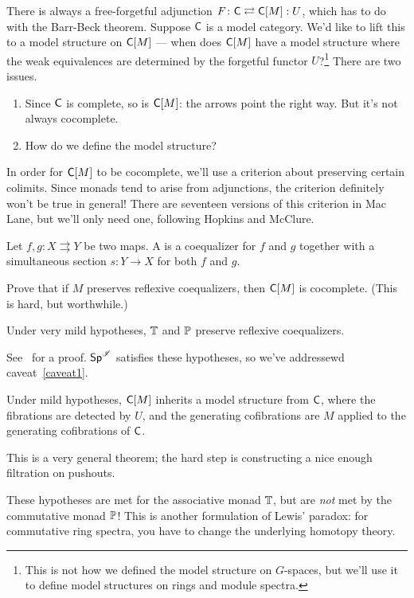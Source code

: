 There is always a free-forgetful adjunction $F\colon \fC\rightleftarrows \fC[M]: U$, which has to do with the
Barr-Beck theorem. Suppose $\fC$ is a model category. We'd like to lift this to a model structure on $\fC[M]$ ---
when does $\fC[M]$ have a model structure where the weak equivalences are determined by the forgetful functor
$U$?\footnote{This is not how we defined the model structure on $G$-spaces, but we'll use it to define model
structures on rings and module spectra.} There are two issues.
\begin{enumerate}
	\item\label{caveat1} Since $\fC$ is complete, so is $\fC[M]$: the arrows point the right way. But it's not
	always cocomplete.
	\item How do we define the model structure?
\end{enumerate}
In order for $\fC[M]$ to be cocomplete, we'll use a criterion about preserving certain colimits. Since monads tend
to arise from adjunctions, the criterion definitely won't be true in general! There are seventeen versions of this
criterion in Mac Lane, but we'll only need one, following Hopkins and McClure.
\begin{defn}
Let $f,g\colon X\rightrightarrows Y$ be two maps. A  is a coequalizer for $f$ and $g$
together with a simultaneous section $s\colon Y\to X$ for both $f$ and $g$.
\end{defn}
\begin{ex}
Prove that if $M$ preserves reflexive coequalizers, then $\fC[M]$ is cocomplete. (This is hard, but worthwhile.)
\end{ex}
\begin{prop}
Under very mild hypotheses, $\T$ and $\P$ preserve reflexive coequalizers.
\end{prop}
See~\cite{EKMM} for a proof. $\Spc^\sI$ satisfies these hypotheses, so we've addressewd caveat~\eqref{caveat1}.
\begin{thm}
Under mild hypotheses, $\fC[M]$ inherits a model structure from $\fC$, where the fibrations are detected by $U$,
and the generating cofibrations are $M$ applied to the generating cofibrations of $\fC$.
\end{thm}
This is a very general theorem; the hard step is constructing a nice enough filtration on pushouts.
\begin{warn}
These hypotheses are met for the associative monad $\T$, but are \emph{not} met by the commutative monad $\P$!
This is another formulation of Lewis' paradox: for commutative ring spectra, you have to change the underlying
homotopy theory.
\end{warn}
